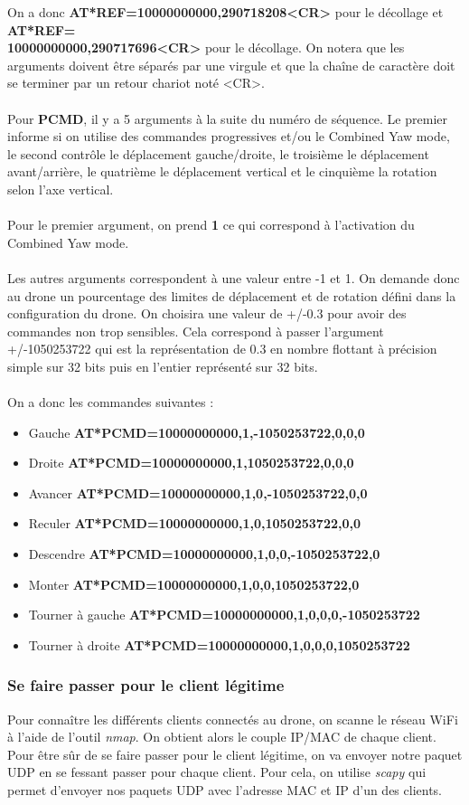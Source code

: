 On a donc \textbf{AT*REF=10000000000,290718208<CR>} pour le décollage et \textbf{AT*REF=}\\\textbf{10000000000,290717696<CR>} pour le décollage. On notera que les arguments doivent être séparés par une virgule et que la chaîne de caractère doit se terminer par un retour chariot noté <CR>.\\\\
Pour \textbf{PCMD}, il y a 5 arguments à la suite du numéro de séquence. Le premier informe si on utilise des commandes progressives et/ou le Combined Yaw mode, le second contrôle le déplacement gauche/droite, le troisième le déplacement avant/arrière, le quatrième le déplacement vertical et le cinquième la rotation selon l'axe vertical.\\\\
Pour le premier argument, on prend \textbf{1} ce qui correspond à l'activation du Combined Yaw mode.\\\\
Les autres arguments correspondent à une valeur entre -1 et 1. On demande donc au drone un pourcentage des limites de déplacement et de rotation défini dans la configuration du drone. On choisira une valeur de +/-0.3 pour avoir des commandes non trop sensibles. Cela correspond à passer l'argument +/-1050253722 qui est la représentation de 0.3 en nombre flottant à précision simple sur 32 bits puis en l'entier représenté sur 32 bits.\\\\
On a donc les commandes suivantes :
\begin{itemize}
\item Gauche \textbf{AT*PCMD=10000000000,1,-1050253722,0,0,0}
\item Droite \textbf{AT*PCMD=10000000000,1,1050253722,0,0,0}
\item Avancer \textbf{AT*PCMD=10000000000,1,0,-1050253722,0,0}
\item Reculer \textbf{AT*PCMD=10000000000,1,0,1050253722,0,0}
\item Descendre \textbf{AT*PCMD=10000000000,1,0,0,-1050253722,0}
\item Monter \textbf{AT*PCMD=10000000000,1,0,0,1050253722,0}
\item Tourner à gauche \textbf{AT*PCMD=10000000000,1,0,0,0,-1050253722}
\item Tourner à droite \textbf{AT*PCMD=10000000000,1,0,0,0,1050253722}
\end{itemize}

\subsubsection{Se faire passer pour le client légitime}
Pour connaître les différents clients connectés au drone, on scanne le réseau WiFi à l'aide de l'outil \textit{nmap}. On obtient alors le couple IP/MAC de chaque client. Pour être sûr de se faire passer pour le client légitime, on va envoyer notre paquet UDP en se fessant passer pour chaque client. Pour cela, on utilise \textit{scapy} qui permet d'envoyer nos paquets UDP avec l'adresse MAC et IP d'un des clients.

